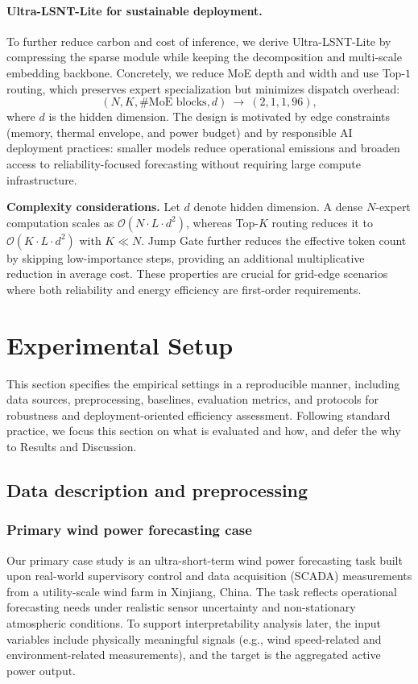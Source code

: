 \documentclass[review,3p,times]{elsarticle}
\begin{document}
\paragraph{Ultra-LSNT-Lite for sustainable deployment.}
To further reduce carbon and cost of inference, we derive Ultra-LSNT-Lite by compressing the sparse module while keeping the decomposition and multi-scale embedding backbone. Concretely, we reduce MoE depth and width and use Top-$1$ routing, which preserves expert specialization but minimizes dispatch overhead:
\begin{equation}
(N,K,\text{\#MoE blocks},d) \ \rightarrow \ (2,1,1,96),
\end{equation}
where $d$ is the hidden dimension. The design is motivated by edge constraints (memory, thermal envelope, and power budget) and by responsible AI deployment practices: smaller models reduce operational emissions and broaden access to reliability-focused forecasting without requiring large compute infrastructure.


\noindent\textbf{Complexity considerations.}\label{sec:complexity}
Let $d$ denote hidden dimension. A dense $N$-expert computation scales as $\mathcal{O}(N\cdot L \cdot d^2)$, whereas Top-$K$ routing reduces it to $\mathcal{O}(K\cdot L \cdot d^2)$ with $K\ll N$. Jump Gate further reduces the effective token count by skipping low-importance steps, providing an additional multiplicative reduction in average cost. These properties are crucial for grid-edge scenarios where both reliability and energy efficiency are first-order requirements.


\section{Experimental Setup}
\label{sec:design}

This section specifies the empirical settings in a reproducible manner, including data sources, preprocessing, baselines, evaluation metrics, and protocols for robustness and deployment-oriented efficiency assessment. Following standard practice, we focus this section on what is evaluated and how, and defer the why to Results and Discussion. 

\subsection{Data description and preprocessing}

\subsubsection{Primary wind power forecasting case}
Our primary case study is an ultra-short-term wind power forecasting task built upon real-world supervisory control and data acquisition (SCADA) measurements from a utility-scale wind farm in Xinjiang, China. The task reflects operational forecasting needs under realistic sensor uncertainty and non-stationary atmospheric conditions. To support interpretability analysis later, the input variables include physically meaningful signals (e.g., wind speed-related and environment-related measurements), and the target is the aggregated active power output.
\end{document}
